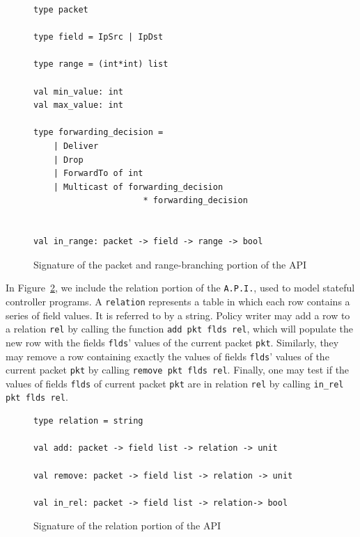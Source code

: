 \documentclass[preprint]{sigplanconf}
\begin{document}
\begin{figure}[ht]
  \begin{lstlisting}
type packet

type field = IpSrc | IpDst 

type range = (int*int) list

val min_value: int 
val max_value: int

type forwarding_decision =
	| Deliver
	| Drop
	| ForwardTo of int
	| Multicast of forwarding_decision
                      * forwarding_decision


val in_range: packet -> field -> range -> bool
\end{lstlisting}

\caption{Signature of the packet and range-branching portion of the API}
\label{fig:range_api}
\end{figure}



In Figure~\ref{fig:rel_api}, we include the relation portion of the \lstinline|A.P.I.|, used to model stateful controller programs. A \lstinline|relation| represents a table in which each row contains a series of field values. It is referred to by a string. Policy writer may add a row to a relation \lstinline|rel| by calling the function \lstinline|add pkt flds rel|, which will populate the new row with the fields \lstinline|flds|' values of the current packet \lstinline|pkt|. Similarly, they may remove a row containing exactly the values of fields \lstinline|flds|' values of the current packet \lstinline|pkt| by calling \lstinline|remove pkt flds rel|. Finally, one may test if the values of fields \lstinline|flds| of current packet \lstinline|pkt| are in relation \lstinline|rel| by calling \lstinline|in_rel pkt flds rel|.



\begin{figure}[ht]
  \begin{lstlisting}
type relation = string

val add: packet -> field list -> relation -> unit

val remove: packet -> field list -> relation -> unit

val in_rel: packet -> field list -> relation-> bool
\end{lstlisting}

\caption{Signature of the relation portion of the API}
\label{fig:rel_api}
\end{figure}
\end{document}
